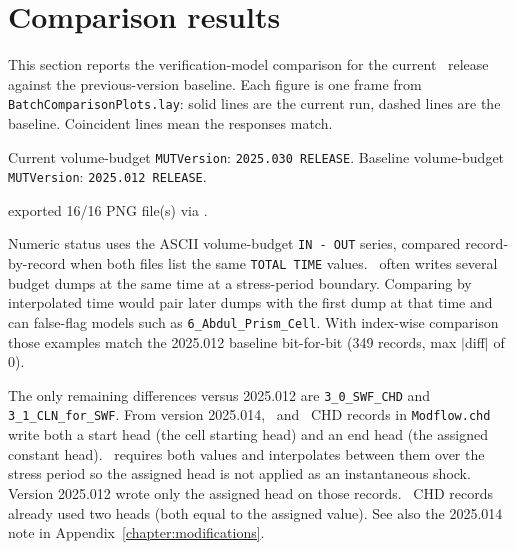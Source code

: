 \section{Comparison results}
This section reports the verification-model comparison for the current \mut\ release against the previous-version baseline. Each figure is one frame from \texttt{BatchComparisonPlots.lay}: solid lines are the current run, dashed lines are the baseline. Coincident lines mean the responses match.

Current volume-budget \texttt{MUTVersion}: \texttt{2025.030 RELEASE}.
Baseline volume-budget \texttt{MUTVersion}: \texttt{2025.012 RELEASE}.

exported 16/16 PNG file(s) via .

Numeric status uses the ASCII volume-budget \texttt{IN - OUT} series, compared
record-by-record when both files list the same \texttt{TOTAL TIME} values.
\mfus\ often writes several budget dumps at the same time at a stress-period
boundary. Comparing by interpolated time would pair later dumps with the first
dump at that time and can false-flag models such as
\texttt{6\_Abdul\_Prism\_Cell}. With index-wise comparison those examples match
the 2025.012 baseline bit-for-bit (349 records, max $|$diff$|$ of 0).

The only remaining differences versus 2025.012 are \texttt{3\_0\_SWF\_CHD} and
\texttt{3\_1\_CLN\_for\_SWF}. From version 2025.014, \cln\ and \swf\ CHD records
in \texttt{Modflow.chd} write both a start head (the cell starting head) and an
end head (the assigned constant head). \mfus\ requires both values and
interpolates between them over the stress period so the assigned head is not
applied as an instantaneous shock. Version 2025.012 wrote only the assigned
head on those records. \gwf\ CHD records already used two heads (both equal to
the assigned value). See also the 2025.014 note in
Appendix~\ref{chapter:modifications}.

